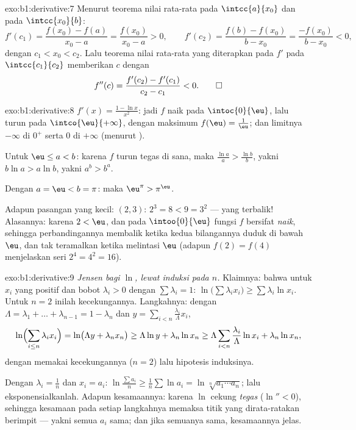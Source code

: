 \begin{solution}{exo:b1:derivative:7}
Menurut teorema nilai rata-rata pada $\intcc{a}{x_0}$ dan pada
$\intcc{x_0}{b}$:
\[
f'(c_1) = \frac{f(x_0) - f(a)}{x_0 - a} = \frac{f(x_0)}{x_0 - a} > 0,
\qquad
f'(c_2) = \frac{f(b) - f(x_0)}{b - x_0} = \frac{-f(x_0)}{b - x_0} < 0,
\]
dengan $c_1 < x_0 < c_2$. Lalu teorema nilai rata-rata yang diterapkan pada $f'$
pada $\intcc{c_1}{c_2}$ memberikan $c$ dengan
\[
f''(c) = \frac{f'(c_2) - f'(c_1)}{c_2 - c_1} < 0 . \qedhere
\]
\end{solution}

\begin{solution}{exo:b1:derivative:8}
$f'(x) = \frac{1 - \ln x}{x^2}$: jadi $f$ naik pada $\intoc{0}{\eu}$,
lalu turun pada $\intco{\eu}{+\infty}$, dengan maksimum $f(\eu) =
\frac1\eu$; dan limitnya $-\infty$ di $0^+$ serta $0$ di $+\infty$ (menurut
).

Untuk $\eu \leq a < b$: karena $f$ turun tegas di sana, maka
$\frac{\ln a}{a} > \frac{\ln b}{b}$, yakni $b \ln a > a \ln b$,
yakni $a^b > b^a$.

Dengan $a = \eu < b = \pi$: maka $\eu^\pi > \pi^\eu$.

Adapun pasangan yang kecil: $(2, 3)$: $2^3 = 8 < 9 = 3^2$ --- yang terbalik! Alasannya:
karena $2 < \eu$, dan pada $\intoo{0}{\eu}$ fungsi $f$ bersifat
\emph{naik}, sehingga perbandingannya membalik ketika kedua bilangannya duduk
di bawah $\eu$, dan tak teramalkan ketika melintasi $\eu$ (adapun $f(2) = f(4)$
menjelaskan seri $2^4 = 4^2 = 16$).
\end{solution}

\begin{solution}{exo:b1:derivative:9}
\emph{Jensen bagi $\ln$, lewat induksi pada $n$.} Klaimnya: bahwa untuk
$x_i$ yang positif dan bobot $\lambda_i > 0$ dengan $\sum \lambda_i = 1$:
$\ln\bigl(\sum \lambda_i x_i\bigr) \geq \sum \lambda_i \ln x_i$. Untuk
$n = 2$ inilah kecekungannya. Langkahnya: dengan $\Lambda = \lambda_1 + \dots +
\lambda_{n-1} = 1 - \lambda_n$ dan $y = \sum_{i<n}
\frac{\lambda_i}{\Lambda} x_i$,
\[
\ln\Bigl(\sum_{i \leq n} \lambda_i x_i\Bigr)
= \ln\bigl(\Lambda y + \lambda_n x_n\bigr)
\geq \Lambda \ln y + \lambda_n \ln x_n
\geq \Lambda \sum_{i<n} \frac{\lambda_i}{\Lambda}\ln x_i
+ \lambda_n \ln x_n,
\]
dengan memakai kecekungannya ($n = 2$) lalu hipotesis induksinya.

Dengan $\lambda_i = \frac 1n$ dan $x_i = a_i$: $\ln\frac{\sum a_i}{n}
\geq \frac 1n \sum \ln a_i = \ln\sqrt[n]{a_1\cdots a_n}$;
lalu eksponensialkanlah. Adapun kesamaannya: karena $\ln$ cekung \emph{tegas} ($\ln'' < 0$),
sehingga kesamaan pada setiap langkahnya memaksa titik yang dirata-ratakan berimpit ---
yakni semua $a_i$ sama; dan jika semuanya sama, kesamaannya jelas.
\end{solution}

